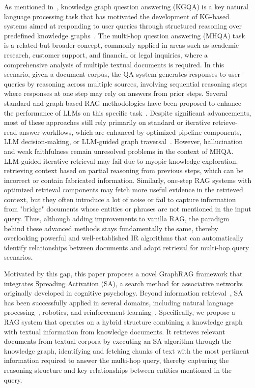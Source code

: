 \documentclass{article}
\begin{document}
As mentioned in~\cite{peng2024graph}, knowledge graph question answering (KGQA) is a key natural language processing task that has motivated the development of KG-based systems aimed at responding to user queries through structured reasoning over predefined knowledge graphs~\cite{zhang2021neural, lavrinovics2025knowledge, pan2024unifying}. The multi-hop question answering (MHQA) task is a related but broader concept, commonly applied in areas such as academic research, customer support, and financial or legal inquiries, where a comprehensive analysis of multiple textual documents is required. In this scenario, given a document corpus, the QA system generates responses to user queries by reasoning across multiple sources, involving sequential reasoning steps where responses at one step may rely on answers from prior steps. Several standard and graph-based RAG methodologies have been proposed to enhance the performance of LLMs on this specific task~\cite{zhang2023end, jeong2024adaptive, wang2024knowledge, jimenez2024hipporag}. Despite significant advancements, most of these approaches still rely primarily on standard or iterative retrieve-read-answer workflows, which are enhanced by optimized pipeline components, LLM decision-making, or LLM-guided graph traversal~\cite{singh2025agentic, fan2024survey}. However, hallucination and weak faithfulness remain unresolved problems in the context of MHQA. LLM-guided iterative retrieval may fail due to myopic knowledge exploration, retrieving context based on partial reasoning from previous steps, which can be incorrect or contain fabricated information. Similarly, one-step RAG systems with optimized retrieval components may fetch more useful evidence in the retrieved context, but they often introduce a lot of noise or fail to capture information from "bridge" documents whose entities or phrases are not mentioned in the input query. Thus, although adding improvements to vanilla RAG, the paradigm behind these advanced methods stays fundamentally the same, thereby overlooking powerful and well-established IR algorithms that can automatically identify relationships between documents and adapt retrieval for multi-hop query scenarios.

Motivated by this gap, this paper proposes a novel GraphRAG framework that integrates Spreading Activation (SA), a search method for associative networks originally developed in cognitive psychology. Beyond information retrieval~\cite{crestani1997application}, SA has been successfully applied in several domains, including natural language processing~\cite{pollack1982natural, tsatsaronis2007word}, robotics, and reinforcement learning~\cite{kono2019activation}. Specifically, we propose a RAG system that operates on a hybrid structure combining a knowledge graph with textual information from knowledge documents. It retrieves relevant documents from textual corpora by executing an SA algorithm through the knowledge graph, identifying and fetching chunks of text with the most pertinent information required to answer the multi-hop query, thereby capturing the reasoning structure and key relationships between entities mentioned in the query. 
\end{document}
